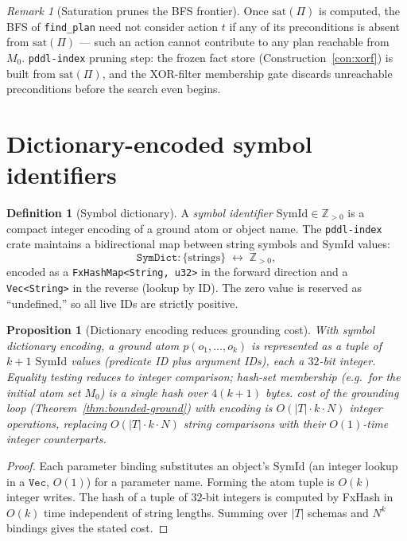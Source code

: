 \documentclass[11pt,oneside]{book}
\theoremstyle{definition}
\newtheorem{definition}{Definition}[chapter]
\theoremstyle{plain}
\newtheorem{proposition}[theorem]{Proposition}
\theoremstyle{remark}
\newtheorem*{remark}{Remark}
\newcommand{\code}[1]{\texttt{#1}}
\begin{document}
\begin{remark}[Saturation prunes the BFS frontier]
Once $\mathrm{sat}(\Pi)$ is computed, the BFS of \code{find\_plan} need not consider
action $t$ if any of its preconditions is absent from $\mathrm{sat}(\Pi)$ --- such an
action cannot contribute to any plan reachable from $M_0$.%
\code{pddl-index} pruning step: the frozen fact store (Construction~\ref{con:xorf}) is
built from $\mathrm{sat}(\Pi)$, and the XOR-filter membership gate discards unreachable
preconditions before the search even begins.
\end{remark}

\section{Dictionary-encoded symbol identifiers}

\begin{definition}[Symbol dictionary]\label{def:symdict}
A \emph{symbol identifier} $\mathrm{SymId}\in\mathbb{Z}_{>0}$ is a compact integer
encoding of a ground atom or object name. The \code{pddl-index} crate maintains a
bidirectional map between string symbols and $\mathrm{SymId}$ values:
\[
\code{SymDict}: \{\text{strings}\} \;\leftrightarrow\; \mathbb{Z}_{>0},
\]
encoded as a \code{FxHashMap<String, u32>} in the forward direction and a \code{Vec<String>}
in the reverse (lookup by ID). The zero value is reserved as ``undefined,'' so all live
IDs are strictly positive.
\end{definition}

\begin{proposition}[Dictionary encoding reduces grounding cost]
\label{prop:dictcost}
With symbol dictionary encoding, a ground atom $p(o_1,\dots,o_k)$ is represented as a
tuple of $k+1$ $\mathrm{SymId}$ values (predicate ID plus argument IDs), each a
$32$-bit integer. Equality testing reduces to integer comparison; hash-set membership
(e.g.\ for the initial atom set $M_0$) is a single hash over $4(k+1)$ bytes.%
cost of the grounding loop (Theorem~\ref{thm:bounded-ground}) with encoding is
$O(|T|\cdot k \cdot N)$ integer operations, replacing $O(|T|\cdot k \cdot N)$ string
comparisons with their $O(1)$-time integer counterparts.
\end{proposition}

\begin{proof}
Each parameter binding substitutes an object's $\mathrm{SymId}$ (an integer lookup in a
$\code{Vec}$, $O(1)$) for a parameter name. Forming the atom tuple is $O(k)$ integer
writes. The hash of a tuple of $32$-bit integers is computed by FxHash in $O(k)$ time
independent of string lengths. Summing over $|T|$ schemas and $N^k$ bindings gives the
stated cost.
\end{proof}
\end{document}
